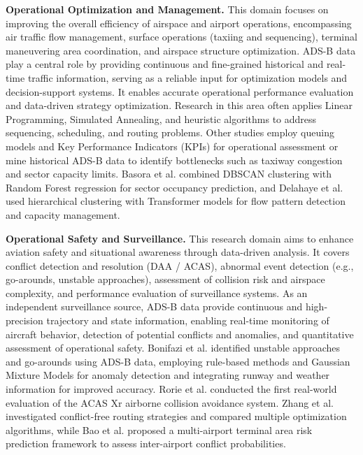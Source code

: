 \textbf{Operational Optimization and Management.} 
This domain focuses on improving the overall efficiency of airspace and airport operations, encompassing air traffic flow management, surface operations (taxiing and sequencing), terminal maneuvering area coordination, and airspace structure optimization. ADS-B data play a central role by providing continuous and fine-grained historical and real-time traffic information, serving as a reliable input for optimization models and decision-support systems. It enables accurate operational performance evaluation and data-driven strategy optimization. Research in this area often applies Linear Programming, Simulated Annealing, and heuristic algorithms to address sequencing, scheduling, and routing problems. Other studies employ queuing models and Key Performance Indicators (KPIs) for operational assessment or mine historical ADS-B data to identify bottlenecks such as taxiway congestion and sector capacity limits. Basora et al. \cite{basora2018occupancy} combined DBSCAN clustering with Random Forest regression for sector occupancy prediction, and Delahaye et al. \cite{delahaye2022air} used hierarchical clustering with Transformer models for flow pattern detection and capacity management.

\textbf{Operational Safety and Surveillance.} 
This research domain aims to enhance aviation safety and situational awareness through data-driven analysis. It covers conflict detection and resolution (DAA / ACAS), abnormal event detection (e.g., go-arounds, unstable approaches), assessment of collision risk and airspace complexity, and performance evaluation of surveillance systems. As an independent surveillance source, ADS-B data provide continuous and high-precision trajectory and state information, enabling real-time monitoring of aircraft behavior, detection of potential conflicts and anomalies, and quantitative assessment of operational safety.
Bonifazi et al. \cite{bonifazi2021modeling} identified unstable approaches and go-arounds using ADS-B data, employing rule-based methods and Gaussian Mixture Models for anomaly detection and integrating runway and weather information for improved accuracy. Rorie et al. \cite{rorie2024detect} conducted the first real-world evaluation of the ACAS Xr airborne collision avoidance system. Zhang et al. \cite{zhang2024study} investigated conflict-free routing strategies and compared multiple optimization algorithms, while Bao et al. \cite{bao2024exploring} proposed a multi-airport terminal area risk prediction framework to assess inter-airport conflict probabilities. 

